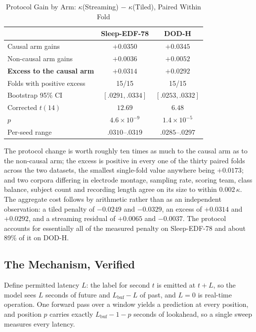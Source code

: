 \documentclass[conference]{IEEEtran}
\begin{document}
\begin{table}[t]
\caption{Protocol Gain by Arm: $\kappa$(Streaming) $-$ $\kappa$(Tiled), Paired Within Fold}
\label{tab:asym}
\centering
\footnotesize
\setlength{\tabcolsep}{5pt}
\begin{tabular}{lcc}
\toprule
 & Sleep-EDF-78 & DOD-H \\
\midrule
Causal arm gains       & $+0.0350$ & $+0.0345$ \\
Non-causal arm gains   & $+0.0036$ & $+0.0052$ \\
\midrule
\textbf{Excess to the causal arm} & $\mathbf{+0.0314}$ & $\mathbf{+0.0292}$ \\
Folds with positive excess & 15/15 & 15/15 \\
Bootstrap 95\% CI & $[.0291, .0334]$ & $[.0253, .0332]$ \\
Corrected $t(14)$ & $12.69$ & $6.48$ \\
$p$ & $4.6\times10^{-9}$ & $1.4\times10^{-5}$ \\
Per-seed range & $.0310$--$.0319$ & $.0285$--$.0297$ \\
\bottomrule
\end{tabular}
\end{table}

The protocol change is worth roughly ten times as much to the causal arm as to the non-causal
arm; the excess is positive in every one of the thirty paired folds across the two datasets, the
smallest single-fold value anywhere being $+0.0173$; and two corpora differing in electrode
montage, sampling rate, scoring team, class balance, subject count and recording length agree on
its size to within $0.002\,\kappa$. The aggregate cost follows by arithmetic rather than as an
independent observation: a tiled penalty of $-0.0249$ and $-0.0329$, an excess of $+0.0314$ and
$+0.0292$, and a streaming residual of $+0.0065$ and $-0.0037$. The protocol accounts for
essentially all of the measured penalty on Sleep-EDF-78 and about 89\% of it on DOD-H.

\subsection{The Mechanism, Verified}
\label{sec:latency}

Define permitted latency $L$: the label for second $t$ is emitted at $t+L$, so the model sees $L$
seconds of future and $L_{\text{buf}} - L$ of past, and $L = 0$ is real-time operation. One
forward pass over a window yields a prediction at every position, and position $p$ carries exactly
$L_{\text{buf}} - 1 - p$ seconds of lookahead, so a single sweep measures every latency.
\end{document}
